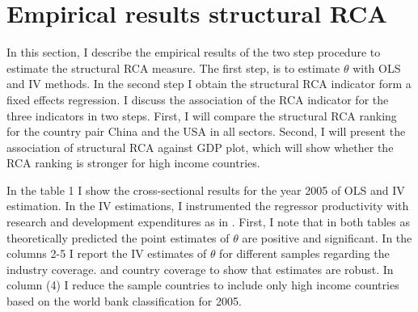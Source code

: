 \section{Empirical results structural RCA}
\label{sec:cross-section}
In this section, I describe the empirical results of the two step procedure to estimate the structural RCA measure.  The first step, is to estimate $\theta$ with OLS and IV methods. %
In the second step I obtain the structural RCA indicator form a fixed effects regression. I discuss the association of the RCA indicator for the three indicators in two steps. First, I will compare the structural RCA ranking for the country pair China and the USA in all sectors. Second, I will present the association of structural RCA against GDP plot, which will show whether the RCA ranking is stronger for high income countries.
\par 
In the table  1 I show the cross-sectional results for the year 2005 of OLS and IV estimation. In the IV estimations, I instrumented the regressor productivity with research and development expenditures as in  \textcite{costinot}. First, I note that in both tables as theoretically predicted the point estimates of $\theta$ are positive and significant.  In the columns 2-5 I report the IV estimates of $\theta$  for different samples regarding  the industry coverage. and country coverage to show that estimates are robust. In column (4) I reduce the sample countries to include only high income countries based on the world bank classification for 2005. 
